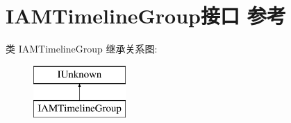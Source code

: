 \hypertarget{interface_i_a_m_timeline_group}{}\section{I\+A\+M\+Timeline\+Group接口 参考}
\label{interface_i_a_m_timeline_group}
类 I\+A\+M\+Timeline\+Group 继承关系图\+:\begin{figure}[H]
\begin{center}
\leavevmode
\includegraphics[height=2.000000cm]{interface_i_a_m_timeline_group}
\end{center}
\end{figure}
